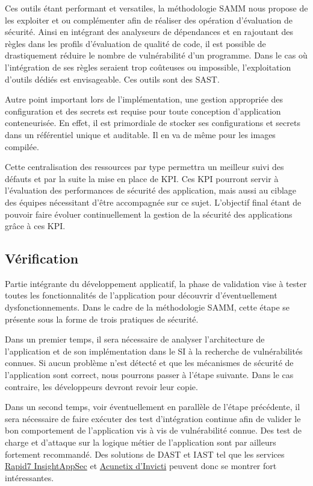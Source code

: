 Ces outils étant performant et versatiles, la méthodologie \ac{SAMM} nous propose de les exploiter et ou complémenter 
afin de réaliser des opération d'évaluation de sécurité.
\newline Ainsi en intégrant des analyseurs de dépendances et en rajoutant des règles dans les profils d'évaluation de 
qualité de code, il est possible de drastiquement réduire le nombre de vulnérabilité d'un programme.
Dans le cas où l'intégration de ses règles seraient trop coûteuses ou impossible, l'exploitation d'outils dédiés est 
envisageable. Ces outils sont des \ac{SAST}. 

Autre point important lors de l'implémentation, une gestion appropriée des configuration et des secrets est requise pour
toute conception d'application conteneurisée. En effet, il est primordiale de stocker ses configurations et secrets dans
un référentiel unique et auditable. Il en va de même pour les images compilée.

Cette centralisation des ressources par type permettra un meilleur suivi des défauts et par la suite la mise en place 
de \ac{KPI}. Ces \ac{KPI} pourront servir à l'évaluation des performances de sécurité des application, mais aussi au 
ciblage des équipes nécessitant d'être accompagnée sur ce sujet.
\newline L'objectif final étant de pouvoir faire évoluer continuellement la gestion de la sécurité des applications grâce
à ces \ac{KPI}.

\subsection{Vérification}
Partie intégrante du développement applicatif, la phase de validation vise à tester toutes les fonctionnalités de 
l'application pour découvrir d'éventuellement dysfonctionnements.
\newline Dans le cadre de la méthodologie \ac{SAMM}, cette étape se présente sous la forme de trois pratiques de sécurité.

Dans un premier temps, il sera nécessaire de analyser l'architecture de l'application et de son implémentation dans le 
\ac{SI} à la recherche de vulnérabilités connues. Si aucun problème n'est détecté et que les mécanismes de sécurité de 
l'application sont correct, nous pourrons passer à l'étape suivante.
\newline Dans le cas contraire, les développeurs devront revoir leur copie.

Dans un second temps, voir éventuellement en parallèle de l'étape précédente, il sera nécessaire de faire exécuter des 
test d'intégration continue afin de valider le bon comportement de l'application vis à vis de vulnérabilité connue.
Des test de charge et d'attaque sur la logique métier de l'application sont par ailleurs fortement recommandé.
\newline Des solutions de \ac{DAST}  et \ac{IAST} tel que les services \href{https://www.rapid7.com/products/insightappsec/}
{Rapid7 InsightAppSec} et \href{https://www.acunetix.com/}{Acunetix d'Invicti} peuvent donc se montrer fort intéressantes.

